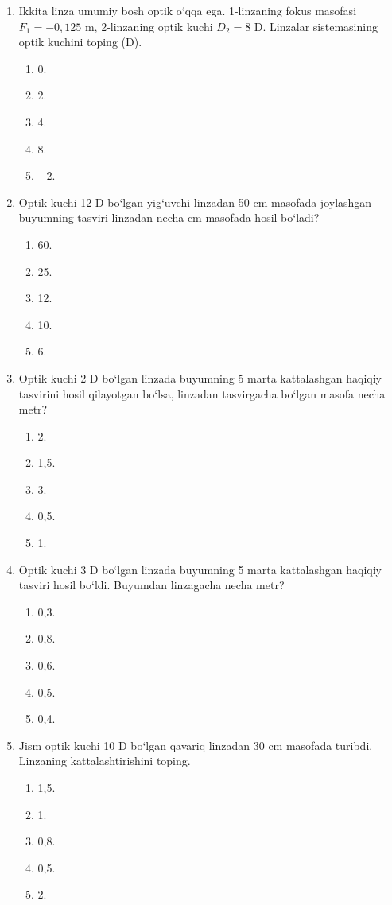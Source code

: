 \begin{enumerate}
\item Ikkita linza umumiy bosh optik o‘qqa ega. 1-linzaning fokus masofasi $F_1=-0{,}125$ m, 2-linzaning optik kuchi $D_2=8$ D. Linzalar sistemasining optik kuchini toping (D).
\begin{enumerate}[label=\Alph*)]
\item 0.
\item 2.
\item 4.
\item 8.
\item $-2$.
\end{enumerate}

\item Optik kuchi 12 D bo‘lgan yig‘uvchi linzadan 50 cm masofada joylashgan buyumning tasviri linzadan necha cm masofada hosil bo‘ladi?
\begin{enumerate}[label=\Alph*)]
\item 60.
\item 25.
\item 12.
\item 10.
\item 6.
\end{enumerate}

\item Optik kuchi 2 D bo‘lgan linzada buyumning 5 marta kattalashgan haqiqiy tasvirini hosil qilayotgan bo‘lsa, linzadan tasvirgacha bo‘lgan masofa necha metr?
\begin{enumerate}[label=\Alph*)]
\item 2.
\item 1,5.
\item 3.
\item 0,5.
\item 1.
\end{enumerate}

\item Optik kuchi 3 D bo‘lgan linzada buyumning 5 marta kattalashgan haqiqiy tasviri hosil bo‘ldi. Buyumdan linzagacha necha metr?
\begin{enumerate}[label=\Alph*)]
\item 0,3.
\item 0,8.
\item 0,6.
\item 0,5.
\item 0,4.
\end{enumerate}

\item Jism optik kuchi 10 D bo‘lgan qavariq linzadan 30 cm masofada turibdi. Linzaning kattalashtirishini toping.
\begin{enumerate}[label=\Alph*)]
\item 1,5.
\item 1.
\item 0,8.
\item 0,5.
\item 2.
\end{enumerate}


\end{enumerate}

